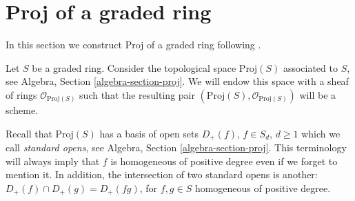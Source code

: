 \section{Proj of a graded ring}
\label{section-proj}

\noindent
In this section we construct Proj of a graded ring
following \cite[II, Section 2]{EGA}.

\medskip\noindent
Let $S$ be a graded ring. Consider the topological space $\text{Proj}(S)$
associated to $S$, see Algebra, Section \ref{algebra-section-proj}.
We will endow this space with a sheaf of rings $\mathcal{O}_{\text{Proj}(S)}$
such that the resulting pair $(\text{Proj}(S), \mathcal{O}_{\text{Proj}(S)})$
will be a scheme.

\medskip\noindent
Recall that $\text{Proj}(S)$ has a basis of open sets $D_{+}(f)$,
$f \in S_d$, $d \geq 1$ which we call {\it standard opens}, see Algebra,
Section \ref{algebra-section-proj}. This terminology will always
imply that $f$ is homogeneous of positive degree even if we forget to
mention it. In addition, the intersection of two standard opens is another:
$D_{+}(f) \cap D_{+}(g) = D_{+}(fg)$, for $f, g \in S$ homogeneous of positive
degree.


